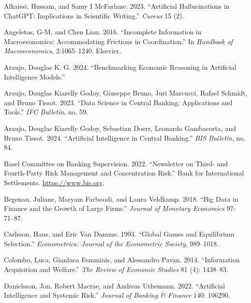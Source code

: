 \documentclass[
]{article}
\newlength{\cslhangindent}
\newenvironment{CSLReferences}[2] %
 {\begin{list}{}{%
  \setlength{\itemindent}{0pt}
  \setlength{\leftmargin}{0pt}
  \setlength{\parsep}{0pt}
  \ifodd #1
   \setlength{\leftmargin}{\cslhangindent}
   \setlength{\itemindent}{-1\cslhangindent}
  \fi
  \setlength{\itemsep}{#2\baselineskip}}}
 {\end{list}}
\theoremstyle{plain}
\theoremstyle{definition}
\theoremstyle{remark}
\begin{document}
\label{refs}
\begin{CSLReferences}{1}{0}
Alkaissi, Hussam, and Samy I McFarlane. 2023. {``Artificial
Hallucinations in ChatGPT: Implications in Scientific Writing.''}
\emph{Cureus} 15 (2).

Angeletos, G-M, and Chen Lian. 2016. {``Incomplete Information in
Macroeconomics: Accommodating Frictions in Coordination.''} In
\emph{Handbook of Macroeconomics}, 2:1065--1240. Elsevier.

Araujo, Douglas K. G. 2024. {``Benchmarking Economic Reasoning in
Artificial Intelligence Models.''}

Araujo, Douglas Kiarelly Godoy, Giuseppe Bruno, Juri Marcucci, Rafael
Schmidt, and Bruno Tissot. 2023. {``Data Science in Central Banking:
Applications and Tools.''} \emph{IFC Bulletin}, no. 59.

Araujo, Douglas Kiarelly Godoy, Sebastian Doerr, Leonardo Gambacorta,
and Bruno Tissot. 2024. {``Artificial Intelligence in Central
Banking.''} \emph{BIS Bulletin}, no. 84.

Basel Committee on Banking Supervision. 2022. {``{Newsletter on Third-
and Fourth-Party Risk Management and Concentration Risk}.''} {Bank for
International Settlements}. \url{https://www.bis.org}.

Begenau, Juliane, Maryam Farboodi, and Laura Veldkamp. 2018. {``Big Data
in Finance and the Growth of Large Firms.''} \emph{Journal of Monetary
Economics} 97: 71--87.

Carlsson, Hans, and Eric Van Damme. 1993. {``Global Games and
Equilibrium Selection.''} \emph{Econometrica: Journal of the Econometric
Society}, 989--1018.

Colombo, Luca, Gianluca Femminis, and Alessandro Pavan. 2014.
{``Information Acquisition and Welfare.''} \emph{The Review of Economic
Studies} 81 (4): 1438--83.

Danielsson, Jon, Robert Macrae, and Andreas Uthemann. 2022.
{``Artificial Intelligence and Systemic Risk.''} \emph{Journal of
Banking \& Finance} 140: 106290.


\end{CSLReferences}
\end{document}
